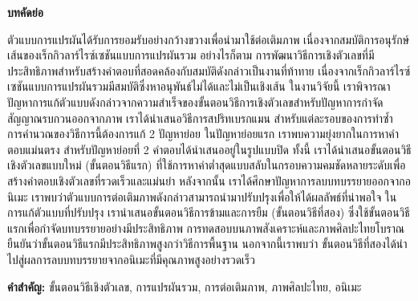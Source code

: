 \thispagestyle{empty}
\vspace{2 cm}
{\huge \bf บทคัดย่อ}

\vspace{2 cm}

\hspace{1cm} ตัวแบบการแปรผันได้รับการยอมรับอย่างกว้างขวางเพื่อนำมาใช้ต่อเติมภาพ เนื่องจากสมบัติการอนุรักษ์เส้นของเร็กกิวลาร์ไรซ์เซชันแบบการแปรผันรวม อย่างไรก็ตาม การพัฒนาวิธีการเชิงตัวเลขที่มีประสิทธิภาพสำหรับสร้างคำตอบที่สอดคล้องกับสมบัติดังกล่าวเป็นงานที่ท้าทาย เนื่องจากเร็กกิวลาร์ไรซ์เซชันแบบการแปรผันรวมมีสมบัติซึ่งหาอนุพันธ์ไม่ได้และไม่เป็นเชิงเส้น ในงานวิจัยนี้ เราพิจารณาปัญหาการแก้ตัวแบบดังกล่าวจากความสำเร็จของขั้นตอนวิธีการเชิงตัวเลขสำหรับปัญหาการกำจัดสัญญาณรบกวนออกจากภาพ เราได้นำเสนอวิธีการสปริทเบรกแมน สำหรับแต่ละรอบของการทำซ้ำ การคำนวณของวิธีการนี้ต้องการแก้ 2 ปัญหาย่อย ในปัญหาย่อยแรก เราพบความยุ่งยากในการหาคำตอบแม่นตรง สำหรับปัญหาย่อยที่ 2 คำตอบได้นำเสนออยู่ในรูปแบบปิด ทั้งนี้ เราได้นำเสนอขั้นตอนวิธีเชิงตัวเลขแบบใหม่ (ขั้นตอนวิธีแรก) ที่ใช้การหาค่าต่ำสุดแบบสลับในกรอบความคมชัดหลายระดับเพื่อสร้างคำตอบเชิงตัวเลขที่รวดเร็วและแม่นยำ หลังจากนั้น เราได้ศึกษาปัญหาการลบบทบรรยายออกจากอนิเมะ เราพบว่าตัวแบบการต่อเติมภาพดังกล่าวสามารถนำมาปรับปรุงเพื่อให้ได้ผลลัพธ์ที่น่าพอใจ ในการแก้ตัวแบบที่ปรับปรุง เรานำเสนอขั้นตอนวิธีการข้ามและการยืม (ขั้นตอนวิธีที่สอง) ซึ่งใช้ขั้นตอนวิธีแรกเพื่อกำจัดบทบรรยายอย่างมีประสิทธิภาพ การทดสอบบนภาพสังเคราะห์และภาพศิลปะไทยโบราณยืนยันว่าขั้นตอนวิธีแรกมีประสิทธิภาพสูงกว่าวิธีการพื้นฐาน นอกจากนี้เราพบว่า ขั้นตอนวิธีที่สองได้นำไปสู่ผลการลบบทบรรยายจากอนิเมะที่มีคุณภาพสูงอย่างรวดเร็ว

\vspace{1 cm}
{\bf{คำสำคัญ:}} ขั้นตอนวิธีเชิงตัวเลข, การแปรผันรวม, การต่อเติมภาพ, ภาพศิลปะไทย, อนิเมะ\\
\newpage